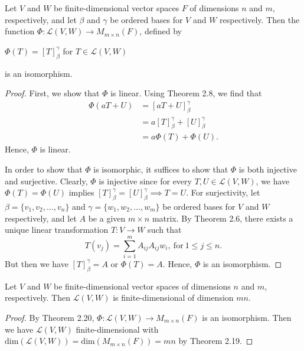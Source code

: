 \begin{theorem}
    Let \( V  \) and \( W  \) be finite-dimensional vector spaces \( F  \) of dimensions \( n  \) and \( m  \), respectively, and let \( \beta  \) and \( \gamma  \) be ordered bases for \( V  \) and \( W  \) respectively. Then the function \( \Phi: \mathcal{L}(V,W) \to {M}_{m \times n}(F)   \), defined by  
    \begin{center}
        \( \Phi(T) = [T]_{\beta}^{\gamma}  \) for \( T \in \mathcal{L}(V,W) \)
    \end{center}
    is an isomorphism.
\end{theorem}
\begin{proof}
First, we show that \( \Phi  \) is linear. Using Theorem 2.8, we find that 
\begin{align*}
    \Phi (aT+U) &= [aT + U]_{\beta}^{\gamma}  \\
                &= a [T]_{\beta}^{\gamma}  + [U]_{\beta}^{\gamma} \\
                &= a \Phi(T) + \Phi(U).
\end{align*}
Hence, \( \Phi  \) is linear.

In order to show that \( \Phi  \) is isomorphic, it suffices to show that \( \Phi  \) is both injective and surjective. Clearly, \( \Phi  \) is injective since for every \( T,U \in \mathcal{L}(V,W) \), we have \( \Phi(T) = \Phi(U)  \) implies \( [T]_{\beta}^{\gamma}  = [U]_{\beta}^{\gamma} \implies T = U   \). For surjectivity, let \( \beta = \{ {v}_{1}, {v}_{2}, \dots, {v}_{n} \}  \) and \( \gamma = \{ {w}_{1}, {w}_{2}, \dots, {w}_{m} \}  \) be ordered bases for \( V  \) and \( W \) respectively, and let \( A  \) be a given \( m \times n  \) matrix. By Theorem 2.6, there exists a unique linear transformation \( T: V \to W  \) such that 
\[  T({v}_{j}) = \sum_{ i=1 }^{ m  } {A}_{ij} {A}_{ij} {w}_{i}, \ \text{for} \ 1 \leq j \leq n. \]
But then we have  \( [T]_{\beta}^{\gamma} = A  \) or \( \Phi(T) = A  \). Hence, \( \Phi  \) is an isomorphism. 
\end{proof}

\begin{corollary}
    Let \( V  \) and \( W  \) be finite-dimensional vector spaces of dimensions \( n  \) and \( m  \), respectively. Then \( \mathcal{L}(V,W) \) is finite-dimensional of dimension \( mn  \).
\end{corollary} 
\begin{proof}
    By Theorem 2.20, \( \Phi: \mathcal{L}(V,W) \to {M}_{m \times n}(F) \) is an isomorphism. Then we have \( \mathcal{L}(V,W) \) finite-dimensional with  \( \text{dim}(\mathcal{L}(V,W)) = \text{dim}({M}_{m \times n }(F)) = mn  \) by Theorem 2.19.
\end{proof}

